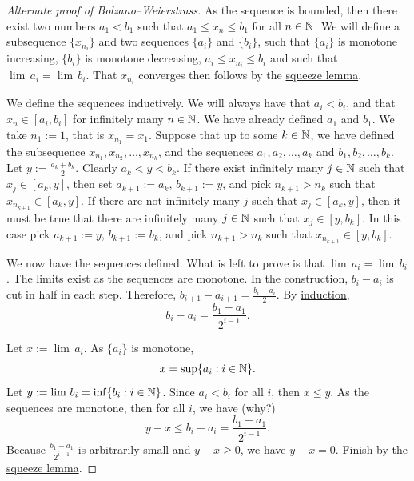 \begin{proof}[Alternate proof of Bolzano--Weierstrass]
As the sequence is bounded, then there exist two numbers $a_1 < b_1$
such that $a_1 \leq x_n \leq b_1$ for all $n \in {\mathbb{N}}$.
We will define a subsequence $\{ x_{n_i} \}$ and two
sequences $\{ a_i \}$ and $\{ b_i \}$, such that
$\{ a_i \}$ is monotone increasing, $\{ b_i \}$ is monotone decreasing,
$a_i \leq x_{n_i} \leq b_i$ and such that $\lim\, a_i = \lim\, b_i$.   That
$x_{n_i}$ converges then follows by the \hyperref[squeeze:lemma]{squeeze lemma}.

We define the sequences inductively.  We will always have that $a_i < b_i$,
and that $x_n \in [a_i,b_i]$ for infinitely many
$n \in {\mathbb{N}}$.
We have already defined $a_1$ and $b_1$.  We take $n_1 := 1$, that is
$x_{n_1} = x_1$.
Suppose that up to some $k \in {\mathbb{N}}$,
we have defined the subsequence $x_{n_1}, x_{n_2}, \ldots,
x_{n_k}$, and the sequences $a_1,a_2,\ldots,a_k$
and $b_1,b_2,\ldots,b_k$.
Let $y := \frac{a_k+b_k}{2}$.
Clearly
$a_k < y < b_k$.  If there exist infinitely many $j \in {\mathbb{N}}$
such that $x_j \in [a_k,y]$, then set $a_{k+1} := a_k$, $b_{k+1} := y$,
and pick $n_{k+1} > n_{k}$
such that $x_{n_{k+1}} \in [a_k,y]$.  If there are not infinitely many 
$j$ such that 
$x_j \in [a_k,y]$, then it must be true that there are infinitely many $j \in
{\mathbb{N}}$ such that 
$x_j \in [y,b_k]$.  In this case pick $a_{k+1} := y$, $b_{k+1} := b_k$,
and pick $n_{k+1} > n_{k}$
such that $x_{n_{k+1}} \in [y,b_k]$.

We now have the sequences defined.  What is left to prove is that
$\lim\, a_i = \lim\, b_i$.  The limits exist as the sequences
are monotone.  In the construction,
$b_i - a_i$ is cut in half in each step.  Therefore,
$b_{i+1} - a_{i+1} = \frac{b_i-a_i}{2}$.  By
\hyperref[induction:thm]{induction},
\begin{equation*}
b_i - a_i = \frac{b_1-a_1}{2^{i-1}} .
\end{equation*}

Let $x := \lim\, a_i$.  As $\{ a_i \}$ is monotone,
\begin{equation*}
x = \sup \{ a_i : i \in {\mathbb{N}} \} .
\end{equation*}
Let $y := \lim\, b_i = \inf \{ b_i : i \in {\mathbb{N}} \}$.  Since $a_i < b_i$ for
all $i$, then $x \leq y$.
As the sequences are monotone, then
for all $i$, we have (why?)
\begin{equation*}
y-x \leq b_i-a_i = \frac{b_1-a_1}{2^{i-1}} .
\end{equation*}
Because $\frac{b_1-a_1}{2^{i-1}}$ is arbitrarily small and $y-x \geq 0$,
we have $y-x = 0$.  Finish by the \hyperref[squeeze:lemma]{squeeze lemma}.
\end{proof}

